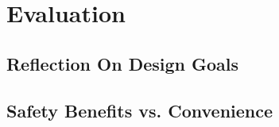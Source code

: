 \chapter{Evaluation}

\section{Reflection On Design Goals}

\section{Safety Benefits vs. Convenience}